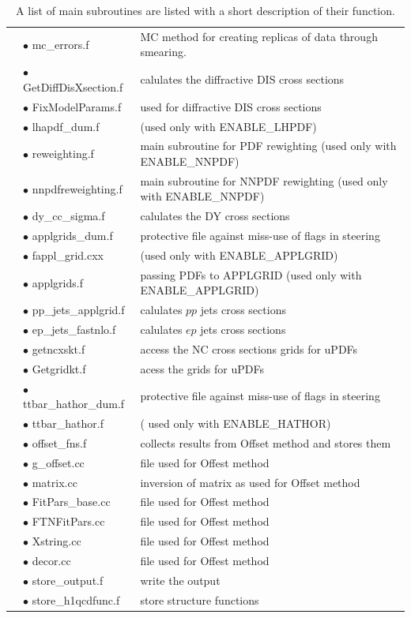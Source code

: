 \begin{center}
\begin{table}
\begin{tabular}{lp{4cm}p{10cm}}
& $\bullet$ mc\_errors.f & MC method for creating replicas of data through smearing. \\\cmidrule{2-3}
& $\bullet$ GetDiffDisXsection.f  & calulates the diffractive DIS cross sections \\
& $\bullet$ FixModelParams.f  & used for diffractive DIS cross sections \\\cmidrule{2-3}
& $\bullet$ lhapdf\_dum.f   & \tiny (used only with ENABLE\_LHPDF)\\
& $\bullet$ reweighting.f & main subroutine for PDF rewighting \tiny (used only with ENABLE\_NNPDF) \\
& $\bullet$ nnpdfreweighting.f & main subroutine for NNPDF rewighting \tiny (used only with ENABLE\_NNPDF) \\\cmidrule{2-3}
& $\bullet$ dy\_cc\_sigma.f  & calulates the DY cross sections \\
& $\bullet$ applgrids\_dum.f    & protective file against miss-use of flags in steering\\
& $\bullet$ fappl\_grid.cxx  &  \tiny (used only with ENABLE\_APPLGRID) \\
& $\bullet$ applgrids.f    &  passing PDFs to APPLGRID \tiny (used only with ENABLE\_APPLGRID) \\
& $\bullet$ pp\_jets\_applgrid.f   & calulates $pp$ jets cross sections  \\
& $\bullet$ ep\_jets\_fastnlo.f  &  calulates $ep$ jets cross sections \\\cmidrule{2-3} 
& $\bullet$ getncxskt.f  & access the NC cross sections grids for uPDFs\\
& $\bullet$ Getgridkt.f & acess the grids for uPDFs \\\cmidrule{2-3}
& $\bullet$  ttbar\_hathor\_dum.f  & protective file against miss-use of flags in steering\\
& $\bullet$  ttbar\_hathor.f  & \tiny ( used only with ENABLE\_HATHOR) \\\cmidrule{2-3}
& $\bullet$ offset\_fns.f & collects results from Offset method and stores them\\
& $\bullet$  g\_offset.cc  & file used for Offest method\\
& $\bullet$  matrix.cc  & inversion of matrix as used for Offset method \\
& $\bullet$  FitPars\_base.cc  & file used for Offest method\\
& $\bullet$  FTNFitPars.cc   & file used for Offest method\\
& $\bullet$  Xstring.cc   & file used for Offest method\\
& $\bullet$  decor.cc   & file used for Offest method\\\cmidrule{2-3}
& $\bullet$ store\_output.f & write the output  \\
& $\bullet$ store\_h1qcdfunc.f & store structure functions   \\
\bottomrule
\end{tabular}
\caption{A list of main subroutines are listed with a short description of their function.}
\label{tab:list}
\end{table}
\end{center}

